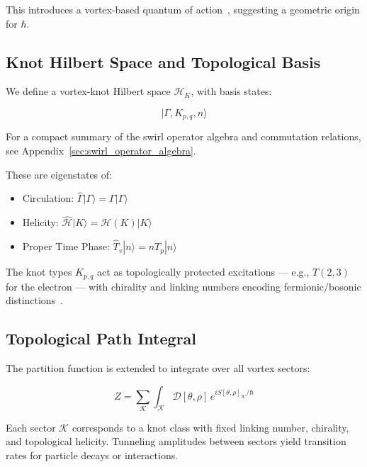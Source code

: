 \documentclass[preprint]{revtex4-2}
\begin{document}
    This introduces a vortex-based quantum of action~\cite{ranada1992knots}, suggesting a geometric origin for \( \hbar \).

    \subsection{Knot Hilbert Space and Topological Basis}
    We define a vortex-knot Hilbert space \( \mathcal{H}_K \), with basis states:

    \begin{equation}
    | \Gamma, K_{p,q}, n \rangle
    \end{equation}

    For a compact summary of the swirl operator algebra and commutation relations, see Appendix~\ref{sec:swirl_operator_algebra}.

    These are eigenstates of:

    \begin{itemize}
        \item Circulation: \( \hat{\Gamma} | \Gamma \rangle = \Gamma | \Gamma \rangle \)
        \item Helicity: \( \hat{\mathcal{H}} | K \rangle = \mathcal{H}(K) | K \rangle \)
        \item Proper Time Phase: \( \hat{T}_v | n \rangle = n T_p | n \rangle \)
    \end{itemize}

    The knot types \( K_{p,q} \) act as topologically protected excitations — e.g., \( T(2,3) \) for the electron — with chirality and linking numbers encoding fermionic/bosonic distinctions~\cite{kleckner2013creation}.

    \subsection{Topological Path Integral}
    The partition function is extended to integrate over all vortex sectors:

    \begin{equation}
    Z = \sum_{\mathcal{K}} \int_{\mathcal{K}} \mathcal{D}[\theta, \rho] \, e^{i S[\theta, \rho]_{\mathcal{K}} / \hbar}
    \end{equation}

    Each sector \( \mathcal{K} \) corresponds to a knot class with fixed linking number, chirality, and topological helicity. Tunneling amplitudes between sectors yield transition rates for particle decays or interactions.
\end{document}
